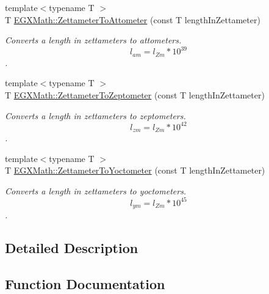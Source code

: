 \begin{DoxyCompactItemize}
{\footnotesize template$<$typename T $>$ }\\T \mbox{\hyperlink{group___e_g_x_math-_conversions-_length_conversions-_s_i-_zettameter-_s_i_ga94b183c6ea2cd7e9df0edb3c9fd59a4a}{E\+G\+X\+Math\+::\+Zettameter\+To\+Attometer}} (const T length\+In\+Zettameter)
\begin{DoxyCompactList}\small\item\em Converts a length in zettameters to attometers. \[ l_{am}=l_{Zm} * 10^{39} \]. \end{DoxyCompactList}\item 
{\footnotesize template$<$typename T $>$ }\\T \mbox{\hyperlink{group___e_g_x_math-_conversions-_length_conversions-_s_i-_zettameter-_s_i_gab9f9d7e92a7aaf47b4b822163cd700c7}{E\+G\+X\+Math\+::\+Zettameter\+To\+Zeptometer}} (const T length\+In\+Zettameter)
\begin{DoxyCompactList}\small\item\em Converts a length in zettameters to zeptometers. \[ l_{zm}=l_{Zm} * 10^{42} \]. \end{DoxyCompactList}\item 
{\footnotesize template$<$typename T $>$ }\\T \mbox{\hyperlink{group___e_g_x_math-_conversions-_length_conversions-_s_i-_zettameter-_s_i_ga027661828604c5467325eb50e084d96d}{E\+G\+X\+Math\+::\+Zettameter\+To\+Yoctometer}} (const T length\+In\+Zettameter)
\begin{DoxyCompactList}\small\item\em Converts a length in zettameters to yoctometers. \[ l_{ym}=l_{Zm} * 10^{45} \]. \end{DoxyCompactList}\end{DoxyCompactItemize}


\subsection{Detailed Description}


\subsection{Function Documentation}
\mbox{\label{group___e_g_x_math-_conversions-_length_conversions-_s_i-_zettameter-_s_i_ga94b183c6ea2cd7e9df0edb3c9fd59a4a}} 
